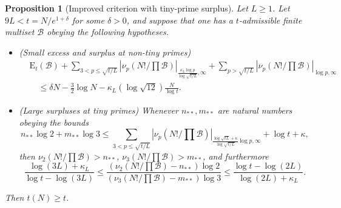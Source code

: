\documentclass[12pt,a4paper,reqno]{amsart}
\numberwithin{equation}{section}
\theoremstyle{plain}
\newtheorem{proposition}[theorem]{Proposition}
\theoremstyle{definition}
\newcommand\tuple{{\mathcal B}}
\newcommand\excess{{\mathrm{E}}}
\begin{document}
\begin{proposition}[Improved criterion with tiny-prime surplus]\label{balance-23'}  Let $L \geq 1$.
  Let $9L < t = N/e^{1+\delta}$ for some $\delta>0$, and suppose that one has a $t$-admissible finite multiset $\tuple$ obeying the following hypotheses.
\begin{itemize}
\item[(i)] (Small excess and surplus at non-tiny primes)
\begin{equation}\label{new-balance-4}
  \begin{split}
&      \excess_t(\tuple) + \sum_{3 < p \leq \sqrt{t/L}}
 |\nu_p(N!/\prod \tuple)|_{\frac{\kappa_L \log p}{\log \sqrt{t/L}},\infty} + 
 \sum_{p>\sqrt{t/L}} |\nu_p(N!/\prod \tuple)|_{\log p,\infty}\\
&\quad    \leq \delta N - \frac{3}{2} \log N - \kappa_L (\log \sqrt{12}) \frac{N}{\log t}.
  \end{split}
 \end{equation}
 \item[(ii)] (Large surpluses at tiny primes) Whenever $n_{**}, m_{**}$ are natural numbers obeying the  bounds
 $$ n_{**} \log 2 + m_{**} \log 3 \leq 
 \sum_{3 < p \leq \sqrt{t/L}}
 |\nu_p(N!/\prod \tuple)|_{\frac{\log \sqrt{tL} + \kappa}{\log\sqrt{t/L}} \log p,\infty}
 + \log t + \kappa,$$
 then $\nu_2(N!/\prod \tuple) > n_{**}$, $\nu_3(N!/\prod \tuple) > m_{**}$, and furthermore
 $$
 \frac{\log(3L)+\kappa_L}{\log t - \log(3L)} \leq \frac{(\nu_2(N!/\prod \tuple)-n_{**}) \log 2}{(\nu_3(N!/\prod \tuple)-m_{**}) \log 3} \leq \frac{\log t - \log(2L)}{\log(2L)+\kappa_L}.$$
 \end{itemize}
  Then $t(N) \geq t$.
\end{proposition}
\end{document}
